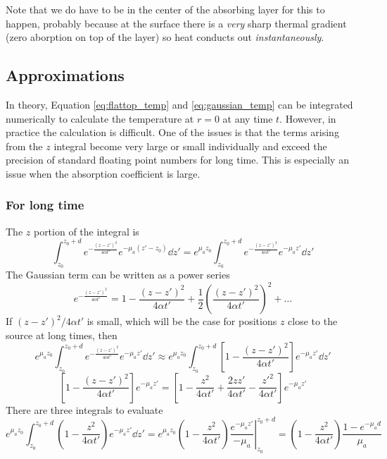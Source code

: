 \documentclass[]{article}
\begin{document}
Note that we do have to be in the center of the absorbing layer for this to happen, probably because at the surface there is a \emph{very}
sharp thermal gradient (zero aborption on top of the layer) so heat conducts out \emph{instantaneously}.

\subsection{Approximations}

In theory, Equation \ref{eq:flattop_temp} and \ref{eq:gaussian_temp} can be integrated
numerically to calculate the temperature at $r = 0$ at any time $t$. However,
in practice the calculation is difficult. One of the issues is that the
terms arising from the $z$ integral become very large or small individually and
exceed the precision of standard floating point numbers for long time. This
is especially an issue when the absorption coefficient is large.

\subsubsection{For long time}

The $z$ portion of the integral is
\begin{equation*}
    \int_{z_0}^{z_0 + d} e^{-\frac{(z-z')^2}{4\alpha t'}} e^{-\mu_a (z'-z_0)} \dd z' = e^{\mu_a z_0}\int_{z_0}^{z_0 + d} e^{-\frac{(z-z')^2}{4\alpha t'}} e^{-\mu_a z'} \dd z'
\end{equation*}
The Gaussian term can be written as a power series
\begin{equation*}
  e^{-\frac{(z-z')^2}{4\alpha t'}} = 1 - \frac{(z-z')^2}{4\alpha t'} + \frac{1}{2}\left(\frac{(z-z')^2}{4\alpha t'}\right)^2 + \ldots
\end{equation*}
If $(z-z')^2/4\alpha t'$ is small, which will be the case for positions $z$ close
to the source at long times, then
\begin{equation*}
   e^{\mu_a z_0} \int_{z_0}^{z_0 + d} e^{-\frac{(z-z')^2}{4\alpha t'}} e^{-\mu_a z'} \dd z' \approx
    e^{\mu_a z_0}\int_{z_0}^{z_0 + d} \left[1 - \frac{(z-z')^2}{4\alpha t'}\right] e^{-\mu_a z'} \dd z'
\end{equation*}
\begin{equation*}
    \left[1 - \frac{(z-z')^2}{4\alpha t'}\right] e^{-\mu_a z'}
=   \left[1 - \frac{z^2}{4\alpha t'} + \frac{2zz'}{4\alpha t'} -\frac{z'^2}{4\alpha t'}\right] e^{-\mu_a z'}
\end{equation*}
There are three integrals to evaluate
\begin{equation*}
   e^{\mu_a z_0} \int_{z_0}^{z_0 + d}
   \left(1 -  \frac{z^2}{4\alpha t'}\right)e^{-\mu_a z'}
    \dd z' =
   e^{\mu_a z_0} \left.\left(1 -  \frac{z^2}{4\alpha t'}\right)\frac{e^{-\mu_a z'}}{-\mu_a} \right|_{z_0}^{z_0 + d}
    = \left(1 -  \frac{z^2}{4\alpha t'}\right)\frac{1 - e^{-\mu_a d}}{\mu_a}
\end{equation*}
\end{document}
